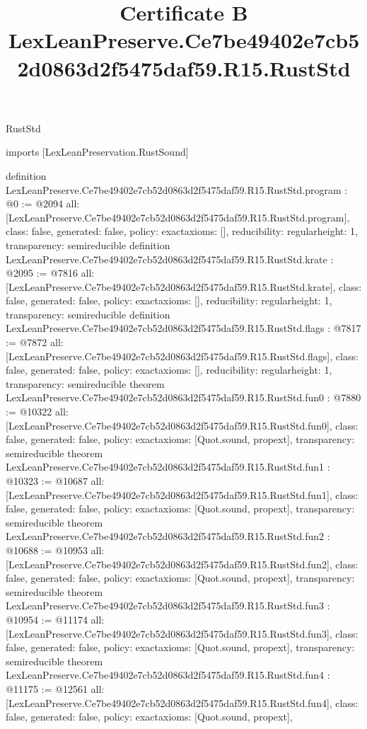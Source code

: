\begin{lexlean}{RustStd}
\title{Certificate B LexLeanPreserve.Ce7be49402e7cb52d0863d2f5475daf59.R15.RustStd}
\begin{coremodule}
imports [LexLeanPreservation.RustSound]

definition LexLeanPreserve.Ce7be49402e7cb52d0863d2f5475daf59.R15.RustStd.program : @0 := @2094 {
  all: [LexLeanPreserve.Ce7be49402e7cb52d0863d2f5475daf59.R15.RustStd.program],
  class: false,
  generated: false,
  policy: exact{axioms: []},
  reducibility: regular{height: 1},
  transparency: semireducible
}
definition LexLeanPreserve.Ce7be49402e7cb52d0863d2f5475daf59.R15.RustStd.krate : @2095 := @7816 {
  all: [LexLeanPreserve.Ce7be49402e7cb52d0863d2f5475daf59.R15.RustStd.krate],
  class: false,
  generated: false,
  policy: exact{axioms: []},
  reducibility: regular{height: 1},
  transparency: semireducible
}
definition LexLeanPreserve.Ce7be49402e7cb52d0863d2f5475daf59.R15.RustStd.flags : @7817 := @7872 {
  all: [LexLeanPreserve.Ce7be49402e7cb52d0863d2f5475daf59.R15.RustStd.flags],
  class: false,
  generated: false,
  policy: exact{axioms: []},
  reducibility: regular{height: 1},
  transparency: semireducible
}
theorem LexLeanPreserve.Ce7be49402e7cb52d0863d2f5475daf59.R15.RustStd.fun0 : @7880 := @10322 {
  all: [LexLeanPreserve.Ce7be49402e7cb52d0863d2f5475daf59.R15.RustStd.fun0],
  class: false,
  generated: false,
  policy: exact{axioms: [Quot.sound, propext]},
  transparency: semireducible
}
theorem LexLeanPreserve.Ce7be49402e7cb52d0863d2f5475daf59.R15.RustStd.fun1 : @10323 := @10687 {
  all: [LexLeanPreserve.Ce7be49402e7cb52d0863d2f5475daf59.R15.RustStd.fun1],
  class: false,
  generated: false,
  policy: exact{axioms: [Quot.sound, propext]},
  transparency: semireducible
}
theorem LexLeanPreserve.Ce7be49402e7cb52d0863d2f5475daf59.R15.RustStd.fun2 : @10688 := @10953 {
  all: [LexLeanPreserve.Ce7be49402e7cb52d0863d2f5475daf59.R15.RustStd.fun2],
  class: false,
  generated: false,
  policy: exact{axioms: [Quot.sound, propext]},
  transparency: semireducible
}
theorem LexLeanPreserve.Ce7be49402e7cb52d0863d2f5475daf59.R15.RustStd.fun3 : @10954 := @11174 {
  all: [LexLeanPreserve.Ce7be49402e7cb52d0863d2f5475daf59.R15.RustStd.fun3],
  class: false,
  generated: false,
  policy: exact{axioms: [Quot.sound, propext]},
  transparency: semireducible
}
theorem LexLeanPreserve.Ce7be49402e7cb52d0863d2f5475daf59.R15.RustStd.fun4 : @11175 := @12561 {
  all: [LexLeanPreserve.Ce7be49402e7cb52d0863d2f5475daf59.R15.RustStd.fun4],
  class: false,
  generated: false,
  policy: exact{axioms: [Quot.sound, propext]},
}
\end{coremodule}
\end{lexlean}

